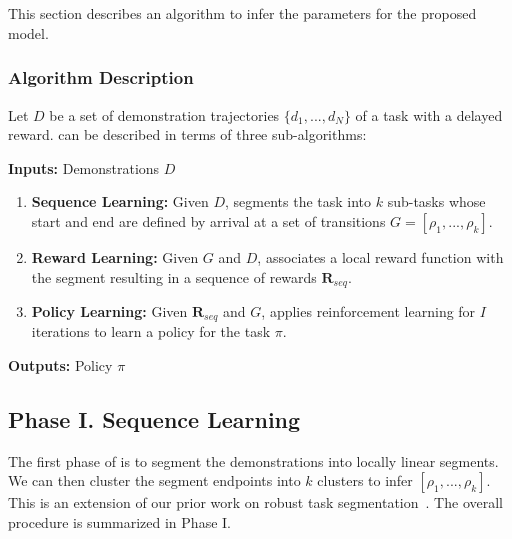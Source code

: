 \section{\hirlfull}
This section describes an algorithm to infer the parameters for the proposed model.

\subsubsection{Algorithm Description}
Let $D$ be a set of demonstration trajectories $\{d_1,...,d_N\}$ of a task with a delayed reward.
\hirl can be described in terms of three sub-algorithms:

\vspace{2pt}
\noindent\textbf{Inputs:} Demonstrations $D$
\begin{enumerate}[
    topsep=0pt,
    noitemsep,
    leftmargin=*,
    ]
    \item \textbf{Sequence Learning: } Given $D$, \hirl segments the task into $k$ sub-tasks whose start and end are defined by arrival at a set of transitions $G = [\rho_1,...,\rho_k]$.
    \item \textbf{Reward Learning: } Given $G$ and $D$, \hirl associates a local reward function with the segment resulting in a sequence of rewards $\mathbf{R}_{seq}$. 
    \item \textbf{Policy Learning: } Given $\mathbf{R}_{seq}$ and $G$, \hirl applies reinforcement learning for $I$ iterations to learn a policy for the task $\pi$.
\end{enumerate}

\noindent\textbf{Outputs:} Policy $\pi$


\subsection*{Phase I. Sequence Learning}
The first phase of \hirl is to segment the demonstrations into locally linear segments.
We can then cluster the segment endpoints into $k$ clusters to infer  $[\rho_1,...,\rho_k]$. This is an extension of our prior work on robust task segmentation~\cite{krishnan2015tsc,murali2016}.
The overall procedure is summarized in Phase I.

